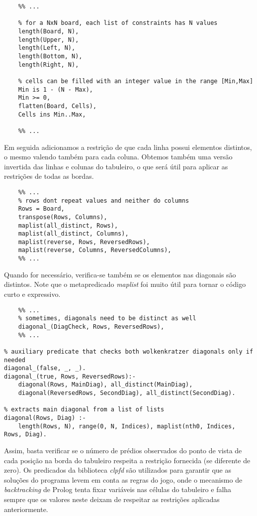 \begin{verbatim}
    %% ...
    
    % for a NxN board, each list of constraints has N values
    length(Board, N),
    length(Upper, N),
    length(Left, N),
    length(Bottom, N),
    length(Right, N),

    % cells can be filled with an integer value in the range [Min,Max]
    Min is 1 - (N - Max),
    Min >= 0,
    flatten(Board, Cells),
    Cells ins Min..Max,
    
    %% ...
\end{verbatim}

Em seguida adicionamos a restrição de que cada linha possui elementos distintos, o mesmo valendo também para cada coluna.
Obtemos também uma versão invertida das linhas e colunas do tabuleiro, o que será útil para aplicar as restrições de todas as bordas.

\begin{verbatim}
    %% ...
    % rows dont repeat values and neither do columns
    Rows = Board,
    transpose(Rows, Columns),
    maplist(all_distinct, Rows),
    maplist(all_distinct, Columns),
    maplist(reverse, Rows, ReversedRows),
    maplist(reverse, Columns, ReversedColumns),
    %% ...
\end{verbatim}

Quando for necessário, verifica-se também se os elementos nas diagonais são distintos.
Note que o metapredicado \textit{maplist} foi muito útil para tornar o código curto e expressivo.

\begin{verbatim}
    %% ...
    % sometimes, diagonals need to be distinct as well
    diagonal_(DiagCheck, Rows, ReversedRows),
    %% ...
    
% auxiliary predicate that checks both wolkenkratzer diagonals only if needed
diagonal_(false, _, _).
diagonal_(true, Rows, ReversedRows):-
    diagonal(Rows, MainDiag), all_distinct(MainDiag),
    diagonal(ReversedRows, SecondDiag), all_distinct(SecondDiag).

% extracts main diagonal from a list of lists
diagonal(Rows, Diag) :-
    length(Rows, N), range(0, N, Indices), maplist(nth0, Indices, Rows, Diag).
\end{verbatim}

Assim, basta verificar se o número de prédios observados do ponto de vista de cada posição na borda do tabuleiro respeita a restrição fornecida (se diferente de zero).
Os predicados da biblioteca \textit{clpfd} são utilizados para garantir que as soluções do programa levem em conta as regras do jogo, onde o mecanismo de \textit{backtracking} de Prolog tenta fixar variáveis nas células do tabuleiro e falha sempre que os valores neste deixam de respeitar as restrições aplicadas anteriormente.

